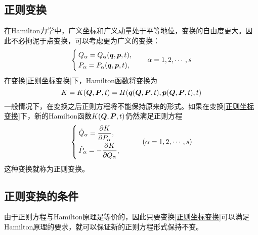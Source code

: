 \subsection{正则变换}

在Hamilton力学中，广义坐标和广义动量处于平等地位，变换的自由度更大。因此不必拘泥于点变换，可以考虑更为广义的变换：
\begin{equation}
	\begin{cases}
		Q_\alpha = Q_\alpha(\boldsymbol{q},\boldsymbol{p},t), \\
		P_\alpha = P_\alpha(\boldsymbol{q},\boldsymbol{p},t),
	\end{cases}\quad \alpha = 1,2,\cdots,s
	\label{正则坐标变换}
\end{equation}
在变换\eqref{正则坐标变换}下，Hamilton函数将变换为
\begin{equation}
	K = K(\boldsymbol{Q},\boldsymbol{P},t) = H(\boldsymbol{q}(\boldsymbol{Q},\boldsymbol{P},t),\boldsymbol{p}(\boldsymbol{Q},\boldsymbol{P},t),t)
\end{equation}
一般情况下，在变换之后正则方程将不能保持原来的形式。如果在变换\eqref{正则坐标变换}下，新的Hamilton函数$K(\boldsymbol{Q},\boldsymbol{P},t)$仍然满足正则方程
\begin{equation}
	\begin{cases}
		\displaystyle \dot{Q}_\alpha = \frac{\partial K}{\partial P_\alpha}, \\[1.5ex]
		\displaystyle \dot{P}_\alpha = -\frac{\partial K}{\partial Q_\alpha},
	\end{cases}\qquad (\alpha =1,2,\cdots,s)
\end{equation}
这种变换就称为{\heiti 正则变换}。

\subsection{正则变换的条件}

由于正则方程与Hamilton原理是等价的，因此只要变换\eqref{正则坐标变换}可以满足Hamilton原理的要求，就可以保证新的正则方程形式保持不变。

